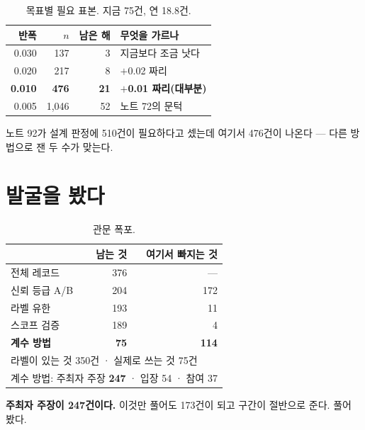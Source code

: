 \documentclass[10pt]{article}
\begin{document}

\begin{table}[t]
\centering\tsize
\caption{목표별 필요 표본. 지금 75건, 연 18.8건.}
\begin{tabular}{rrrl}
\toprule
반폭 & $n$ & 남은 해 & 무엇을 가르나 \\
\midrule
0.030 & 137 & 3 & 지금보다 조금 낫다 \\
0.020 & 217 & 8 & $+$0.02 짜리 \\
\textbf{0.010} & \textbf{476} & \textbf{21} & \textbf{$+$0.01 짜리(대부분)} \\
0.005 & 1,046 & 52 & 노트 72의 문턱 \\
\bottomrule
\end{tabular}
\end{table}

노트 92가 설계 판정에 510건이 필요하다고 셌는데 여기서 476건이 나온다 ---
다른 방법으로 잰 두 수가 맞는다.

\section{발굴을 봤다}

\begin{table}[t]
\centering\tsize
\caption{관문 폭포.}
\begin{tabular}{lrr}
\toprule
& 남는 것 & 여기서 빠지는 것 \\
\midrule
전체 레코드 & 376 & --- \\
신뢰 등급 A/B & 204 & 172 \\
라벨 유한 & 193 & 11 \\
스코프 검증 & 189 & 4 \\
\textbf{계수 방법} & \textbf{75} & \textbf{114} \\
\midrule
\multicolumn{3}{l}{라벨이 있는 것 350건 · 실제로 쓰는 것 75건} \\
\multicolumn{3}{l}{계수 방법: 주최자 주장 \textbf{247} · 입장 54 · 참여 37} \\
\bottomrule
\end{tabular}
\end{table}

\textbf{주최자 주장이 247건이다.} 이것만 풀어도 173건이 되고 구간이 절반으로
준다. 풀어 봤다.
\end{document}
